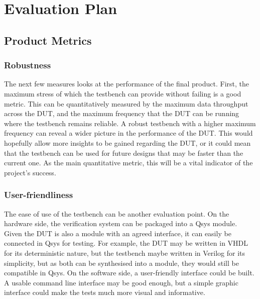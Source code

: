 \section{Evaluation Plan}

\subsection{Product Metrics}
\subsubsection{\textbf{Robustness}}
The next few measures looks at the performance of the final product.
First, the maximum stress of which the testbench can provide without failing is
a good metric.
This can be quantitatively measured by the maximum data throughput across the
DUT, and the maximum frequency that the DUT can be running where the testbench
remains reliable.
A robust testbench with a higher maximum frequency can reveal a wider picture
in the performance of the DUT.
This would hopefully allow more insights to be gained regarding the DUT, or
it could mean that the testbench can be used for future designs that may be
faster than the current one.
As the main quantitative metric, this will be a vital indicator of the
project's success.

\subsubsection{\textbf{User-friendliness}}
The ease of use of the testbench can be another evaluation point.
On the hardware side, the verification system can be packaged into a Qsys
module.
Given the DUT is also a module with an agreed interface, it can easily be
connected in Qsys for testing.
For example, the DUT may be written in VHDL for its deterministic nature, but
the testbench maybe written in Verilog for its simplicity, but as both can be
synthesised into a module, they would still be compatible in Qsys.
On the software side, a user-friendly interface could be built.
A usable command line interface may be good enough, but a simple graphic
interface could make the tests much more visual and informative.

